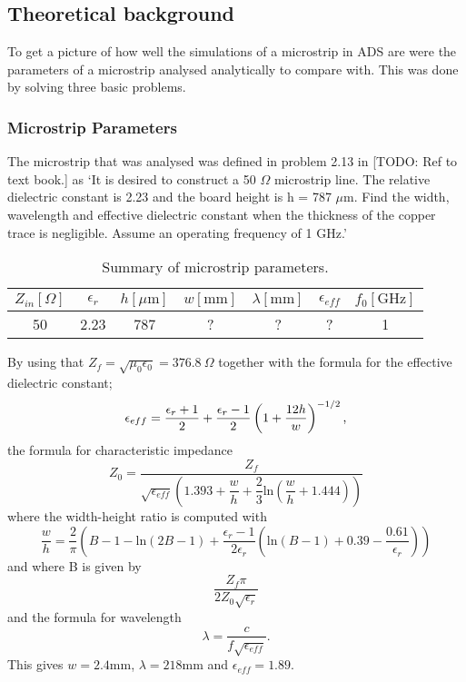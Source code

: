 \documentclass[report.tex]{subfiles}
\begin{document}
\subsection{Theoretical background}\label{sec: Lab1 Theoretical Background}
To get a picture of how well the simulations of a microstrip in ADS are were the parameters of a microstrip analysed analytically to compare with. This was done by solving three basic problems.

\subsubsection{Microstrip Parameters}\label{subsubsec: Microstrip_Parameters}
The microstrip that was analysed was defined in problem 2.13 in [TODO: Ref to text book.] as
`It is desired to construct a 50 $\Omega$ microstrip line. The relative dielectric constant is 2.23 and the board height is h = 787 $\mu \text{m.}$ Find the width, wavelength and effective dielectric constant when the thickness of the copper trace is negligible. Assume an operating frequency of 1 GHz.'

\begin{table}[h]
    \centering
    \caption{Summary of microstrip parameters.}
    \begin{tabular}{c | c | c | c | c | c | c}
        $Z_{in} [\Omega]$ & $\epsilon_r $ & $h [\mu \text{m}]$ & $w [\text{mm}]$ & $\lambda [\text{mm}]$ & $\epsilon_{eff}$ & $f_0 [\text{GHz}]$\\
        \hline
         50 & 2.23 & 787 & ? & ? & ? & 1
    \end{tabular}
    \label{table: Lab1 Microstrip parameters}
\end{table}

By using that $Z_{f} = \sqrt{\mu_{0} \epsilon_{0}} = 376.8\:\Omega$ together with the formula for the effective dielectric constant;
\begin{equation}
	\epsilon_{eff} = \dfrac{\epsilon_{r} + 1}{2} + \dfrac{\epsilon_{r} - 1}{2} \left(1 + {\dfrac{12 h}{w}} \right)^{-1/2} \text ,
\end{equation}
the formula for characteristic impedance
\begin{equation}
	Z_0 = \dfrac{Z_f}{\sqrt{\epsilon_{eff}}\left(1.393 + \dfrac{w}{h} + \dfrac{2}{3} \text{ln}\left(\dfrac{w}{h} + 1.444 \right)\right)}
\end{equation}
where the width-height ratio is computed with
\begin{equation}
	\dfrac{w}{h} = \dfrac{2}{\pi}\left(B - 1 - \text{ln}\left(2B - 1 \right) + \dfrac{\epsilon_r - 1}{2 \epsilon_r}\left(\text{ln}\left(B -1\right) + 0.39 - \dfrac{0.61}{\epsilon_r}\right)\right)
\end{equation}
and where B is given by
\begin{equation}
\dfrac{Z_f \pi}{2Z_0\sqrt{\epsilon_r}}
\end{equation}
and the formula for wavelength
\begin{equation}
	\lambda = \dfrac{c}{f\sqrt{\epsilon_{eff}}}.
\end{equation}
This gives $w = 2.4 \text{mm}$, $\lambda = 218 \text{mm}$ and $\epsilon_{eff} = 1.89 \text{.}$
\end{document}
